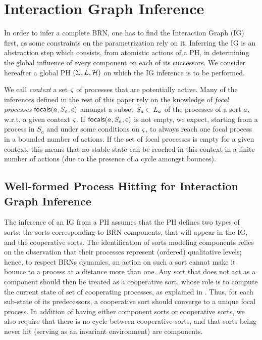 \section{Interaction Graph Inference}\label{sec:infer-IG}

In order to infer a complete BRN, one has to find the Interaction Graph (IG) first, as some constraints on the parametrization rely on it.
Inferring the IG is an abstraction step which consists, from atomistic actions of a PH, in determining the global influence of every component on each of its successors.
We consider hereafter a global PH $(\Sigma,L,\mathcal{H})$ on which the IG inference is to be performed.

We call \emph{context} a set $\varsigma$ of processes that are potentially active.
Many of the inferences defined in the rest of this paper rely on the knowledge of \emph{focal processes} $\mathsf{focals}(a,S_a,\varsigma)$
amongst a subset $S_a \subset L_a$ of the processes of a sort $a$, w.r.t. a given context $\varsigma$.
If $\mathsf{focals}(a,S_a,\varsigma)$ is not empty, we expect, starting from a process in $S_a$ and under some conditions on $\varsigma$, to always reach one focal process in a bounded number of actions.
If the set of focal processes is empty for a given context, this means that no stable state can be reached in this context in a finite number of actions (due to the presence of a cycle amongst bounces).



\subsection{Well-formed Process Hitting for Interaction Graph Inference}\label{ssec:wf}

The inference of an IG from a PH assumes that the PH defines two types of sorts: the sorts corresponding to BRN components, that will appear in the IG, and the cooperative sorts.
The identification of sorts modeling components relies on the observation that their processes represent (ordered) qualitative levels;
hence, to respect BRNs dynamics, an action on such a sort cannot make it bounce to a process at a distance more than one.
Any sort that does not act as a component should then be treated as a cooperative sort, whose role is to compute the current state of set of cooperating processes, as explained in .
Thus, for each sub-state of its predecessors, a cooperative sort should converge to a unique focal process.
In addition of having either component sorts or cooperative sorts, we also require that there is no cycle between cooperative sorts, and that sorts being never hit (\ie serving as an invariant environment) are components.

